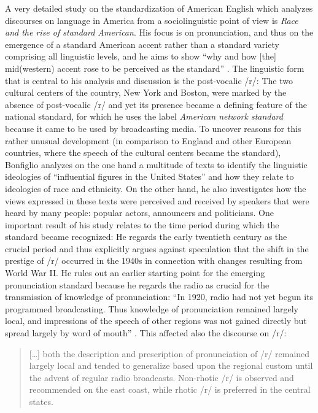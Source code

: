 A very detailed study on the standardization of American English which analyzes discourses on language in America from a sociolinguistic point of view is  \emph{Race and the rise of standard American}. His focus is on pronunciation, and thus on the emergence of a standard American accent rather than a standard variety comprising all linguistic levels, and he aims to show “why and how [the] mid(western) accent rose to be perceived as the standard” \citep[1]{Bonfiglio2002}. The linguistic form that is central to his analysis and discussion is the post-vocalic /r/: The two cultural centers of the country, New York and Boston, were marked by the absence of post-vocalic /r/ and yet its presence became a defining feature of the national standard, for which he uses the label \textit{American network standard} because it came to be used by broadcasting media. To uncover reasons for this rather unusual development (in comparison to England and other European countries, where the speech of the cultural centers became the standard), Bonfiglio analyzes on the one hand a multitude of texts to identify the linguistic ideologies of “influential figures in the United States” and how they relate to ideologies of race and ethnicity. On the other hand, he also investigates how the views expressed in these texts were perceived and received by speakers that were heard by many people: popular actors, announcers and politicians. One important result of his study relates to the time period during which the standard became recognized: He regards the early twentieth century as the crucial period and thus explicitly argues against  speculation that the shift in the prestige of /r/ occurred in the 1940s in connection with changes resulting from World War II. He rules out an earlier starting point for the emerging pronunciation standard because he regards the radio as crucial for the transmission of knowledge of pronunciation: “In 1920, radio had not yet begun its programmed broadcasting. Thus knowledge of pronunciation remained largely local, and impressions of the speech of other regions was not gained directly but spread largely by word of mouth” \citep[47]{Bonfiglio2002}. This affected also the discourse on /r/:

\begin{quote}
[…] both the description and prescription of pronunciation of /r/ remained largely local and tended to generalize based upon the regional custom until the advent of regular radio broadcasts. Non-rhotic /r/ is observed and recommended on the east coast, while rhotic /r/ is preferred in the central states. \citep[54--55]{Bonfiglio2002}
\end{quote}


